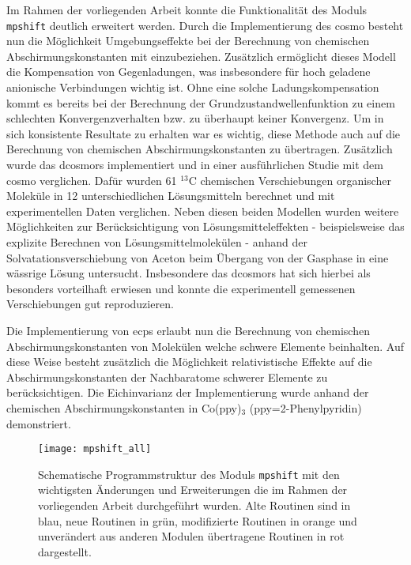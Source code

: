 Im Rahmen der vorliegenden Arbeit konnte die Funktionalität des Moduls \texttt{mpshift} deutlich erweitert werden. Durch die Implementierung des \acf{cosmo} besteht nun die Möglichkeit Umgebungseffekte bei der Berechnung von chemischen Abschirmungskonstanten mit einzubeziehen. Zusätzlich ermöglicht dieses Modell die Kompensation von Gegenladungen, was insbesondere für hoch geladene anionische Verbindungen wichtig ist. Ohne eine solche Ladungskompensation kommt es bereits bei der Berechnung der Grundzustandwellenfunktion zu einem schlechten Konvergenzverhalten bzw. zu überhaupt keiner Konvergenz. Um in sich konsistente Resultate zu erhalten war es wichtig, diese Methode auch auf die Berechnung von chemischen Abschirmungskonstanten zu übertragen. Zusätzlich wurde das \ac{dcosmors} implementiert und in einer ausführlichen Studie mit dem \ac{cosmo} verglichen. Dafür wurden 61 $^{13}$C chemischen Verschiebungen organischer Moleküle in 12 unterschiedlichen Lösungsmitteln berechnet und mit experimentellen Daten verglichen. Neben diesen beiden Modellen wurden weitere Möglichkeiten zur Berücksichtigung von Lösungsmitteleffekten - beispielsweise das explizite Berechnen von Lösungsmittelmolekülen - anhand der Solvatationsverschiebung von Aceton beim Übergang von der Gasphase in eine wässrige Lösung untersucht. Insbesondere das \ac{dcosmors} hat sich hierbei als besonders vorteilhaft erwiesen und konnte die experimentell gemessenen Verschiebungen gut reproduzieren. 

Die Implementierung von \acfp{ecp} erlaubt nun die Berechnung von chemischen Abschirmungskonstanten von Molekülen welche schwere Elemente beinhalten. Auf diese Weise besteht zusätzlich die Möglichkeit relativistische Effekte auf die Abschirmungskonstanten der Nachbaratome schwerer Elemente zu berücksichtigen. Die Eichinvarianz der Implementierung wurde anhand der chemischen Abschirmungskonstanten in Co(ppy)$_3$ (ppy=2-Phenylpyridin) demonstriert. 

\begin{figure}[ht!]
	\centering
	\texttt{[image: mpshift\_all]}
	\captionsetup{figurewithin = chapter}
	\captionsetup{font=small, labelfont=bf}\caption[Neue schematische Programmstruktur des Moduls \texttt{mpshift}]{Schematische Programmstruktur des Moduls \texttt{mpshift} mit den wichtigsten Änderungen und Erweiterungen die im Rahmen der vorliegenden Arbeit durchgeführt wurden. Alte Routinen sind in blau, neue Routinen in grün, modifizierte Routinen in orange und unverändert aus anderen Modulen übertragene Routinen in rot dargestellt.}
\label{abb:neue_programmstruktur}
\end{figure}